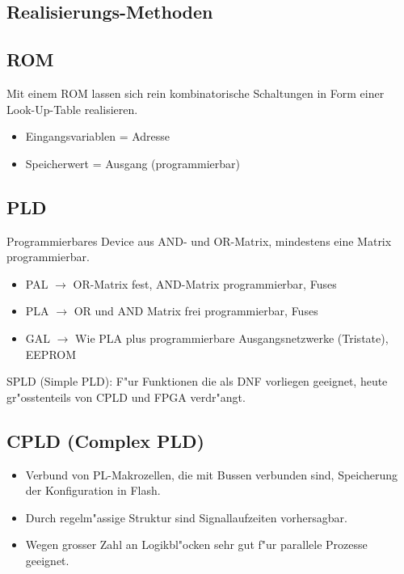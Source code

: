\begin{scriptsize}

\begin{multicols}{2}
\section{Realisierungs-Methoden}
\subsection{ROM}
Mit einem ROM lassen sich rein kombinatorische Schaltungen in Form einer Look-Up-Table realisieren.
\begin{itemize}
	\setlength{\itemsep}{1pt}
  \setlength{\parskip}{0pt}
  \setlength{\parsep}{0pt}
  
	\item Eingangsvariablen = Adresse
	\item Speicherwert = Ausgang (programmierbar)
\end{itemize}

\subsection{PLD}
Programmierbares Device aus AND- und OR-Matrix, mindestens eine Matrix programmierbar.
\begin{itemize}
	\setlength{\itemsep}{1pt}
	\setlength{\parskip}{0pt}
	\setlength{\parsep}{0pt}
	
	\item PAL $\rightarrow$ OR-Matrix fest, AND-Matrix programmierbar, Fuses
	\item PLA $\rightarrow$ OR und AND Matrix frei programmierbar, Fuses
	\item GAL $\rightarrow$ Wie PLA plus programmierbare Ausgangsnetzwerke (Tristate), EEPROM
\end{itemize}
SPLD (Simple PLD): F"ur Funktionen die als DNF vorliegen geeignet, heute gr"osstenteils von CPLD und FPGA verdr"angt.

\subsection{CPLD (Complex PLD)}
\begin{itemize}
	\setlength{\itemsep}{1pt}
	\setlength{\parskip}{0pt}
	\setlength{\parsep}{0pt}
	
	\item Verbund von PL-Makrozellen, die mit Bussen verbunden sind, Speicherung der Konfiguration in Flash.
	\item Durch regelm"assige Struktur sind Signallaufzeiten vorhersagbar.
	\item Wegen grosser Zahl an Logikbl"ocken sehr gut f"ur parallele Prozesse geeignet.
\end{itemize}
\vfill\null
\columnbreak

\end{multicols}
\end{scriptsize}
